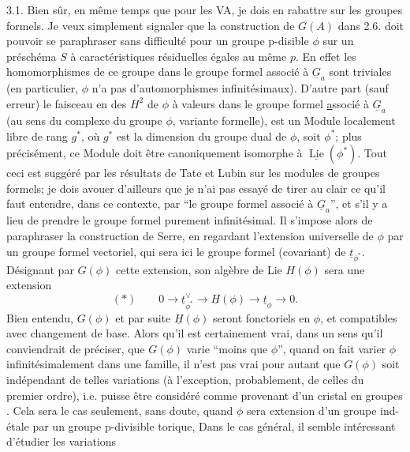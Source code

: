 3.1. Bien sûr, en même temps que pour les VA, je dois en rabattre sur les groupes formels. Je veux simplement signaler que la construction de $G(A)$ dans 2.6. doit pouvoir se paraphraser sans difficulté pour un groupe p-disible $\phi$ sur un préschéma $S$ à caractéristiques résiduelles égales au même $p$. En effet les homomorphismes de ce groupe dans le groupe formel associé à $\underline{G}_a$ sont triviales (en particulier, $\phi$ n'a pas d'automorphismes infinitésimaux). D'autre part (sauf erreur) le faisceau en   des $H^2$ de $\phi$ à valeurs dans le groupe formel \uline{a}ssocié à $\underline{G}_a$ (au sens du complexe du groupe $\phi$, variante formelle), est un Module localement libre de rang $g^*$, où $g^*$ est la dimension du groupe dual de $\phi$, soit $\phi^*$; plus précisément, ce Module doit être canoniquement isomorphe à $\underline{\operatorname{Lie}}(\phi^*)$. \inserted{(}Tout ceci est suggéré par les résultats de Tate et Lubin sur les modules de groupes formels; je dois avouer d'ailleurs que je n'ai pas essayé de tirer au clair ce qu'il faut entendre, dans ce contexte, par ``le groupe formel associé à $\underline{G}_a$'', et s'il y a lieu de prendre le groupe formel purement infinitésimal.\inserted{)} Il s'impose alors de paraphraser la construction de Serre, en regardant l'extension  universelle de $\phi$ par un groupe formel vectoriel, qui sera ici le groupe formel (covariant) de $\underline{t}_{\phi^*}$. Désignant par $G(\phi)$ cette extension, son algèbre de Lie $H(\phi)$ sera une extension
\[
(*)\qquad 0\longrightarrow\underline{t}_{\phi^*}^{\vee}\longrightarrow\underline{H}(\phi)\longrightarrow\underline{t}_{\phi}\longrightarrow0.
\]
Bien entendu, $G(\phi)$ et par suite $\underline{H}(\phi)$ seront fonctoriels en $\phi$, et compatibles avec changement de base. Alors qu'il est certainement vrai, dans un sens qu'il conviendrait de préciser, que  $G(\phi)$ varie ``moins que $\phi$'', quand on fait varier $\phi$ infinitésimalement dans une famille, il n'est pas vrai pour autant que $G(\phi)$ soit indépendant de telles variations (à l'exception, probablement, de celles du premier ordre), i.e. puisse être considéré comme provenant d'un cristal en groupes  . Cela sera le cas\deleted{,} seulement, sans doute, quand $\phi$ sera extension d'un groupe  ind-étale par un groupe p-divisible torique,  Dans le cas général, il semble intéressant d'étudier les variations


